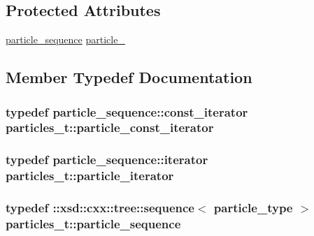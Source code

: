 \subsection*{Protected Attributes}
\begin{DoxyCompactItemize}
\item 
\hyperlink{classparticles__t_a372e39e275f0ebfb91ac53eacdb4a1f2}{particle\-\_\-sequence} \hyperlink{classparticles__t_adc4cfda5d19d40146fb9a640236ff2ef}{particle\-\_\-}
\end{DoxyCompactItemize}


\subsection{Member Typedef Documentation}
\hypertarget{classparticles__t_a2380817b2b2e9911b8c7853d8f075ad3}{
\subsubsection[{particle\-\_\-const\-\_\-iterator}]{\setlength{\rightskip}{0pt plus 5cm}typedef particle\-\_\-sequence\-::const\-\_\-iterator {\bf particles\-\_\-t\-::particle\-\_\-const\-\_\-iterator}}}\label{classparticles__t_a2380817b2b2e9911b8c7853d8f075ad3}
\hypertarget{classparticles__t_a876677de456e8144f2b0c51172d9dc0a}{
\subsubsection[{particle\-\_\-iterator}]{\setlength{\rightskip}{0pt plus 5cm}typedef particle\-\_\-sequence\-::iterator {\bf particles\-\_\-t\-::particle\-\_\-iterator}}}\label{classparticles__t_a876677de456e8144f2b0c51172d9dc0a}
\hypertarget{classparticles__t_a372e39e275f0ebfb91ac53eacdb4a1f2}{
\subsubsection[{particle\-\_\-sequence}]{\setlength{\rightskip}{0pt plus 5cm}typedef \-::xsd\-::cxx\-::tree\-::sequence$<$ {\bf particle\-\_\-type} $>$ {\bf particles\-\_\-t\-::particle\-\_\-sequence}}}\label{classparticles__t_a372e39e275f0ebfb91ac53eacdb4a1f2}

